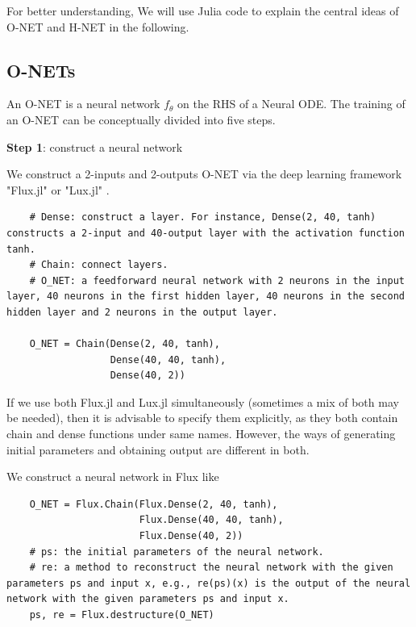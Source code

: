 \documentclass[
	parskip, 			   %
	twoside, 			   %
	DIV=14, 			   %
	BCOR=15.0mm, 		   %
	headsepline, 		   %
	open=right, 		   %
	captions=tableheading, %
	bibliography=totoc,    %
	numbers=noenddot       %
]{scrreprt}
\begin{document}
For better understanding, We will use Julia code to explain the central ideas of O-NET and H-NET in the following.

\subsection{O-NETs}
An O-NET is a neural network $f_{\theta}$ on the RHS of a Neural ODE. The training of an O-NET can be conceptually divided into five steps.

\textbf{Step 1}: construct a neural network

We construct a 2-inputs and 2-outputs O-NET via the deep learning framework "Flux.jl" or "Lux.jl" \cite{pal2022lux}.
\begin{verbatim}
    # Dense: construct a layer. For instance, Dense(2, 40, tanh) constructs a 2-input and 40-output layer with the activation function tanh.
    # Chain: connect layers.
    # O_NET: a feedforward neural network with 2 neurons in the input layer, 40 neurons in the first hidden layer, 40 neurons in the second hidden layer and 2 neurons in the output layer.

    O_NET = Chain(Dense(2, 40, tanh),
                  Dense(40, 40, tanh),
                  Dense(40, 2))
\end{verbatim}

If we use both Flux.jl and Lux.jl simultaneously (sometimes a mix of both may be needed), then it is advisable to specify them explicitly, as they both contain chain and dense functions under same names. However, the ways of generating initial parameters and obtaining output are different in both.

We construct a neural network in Flux like
\begin{verbatim}
    O_NET = Flux.Chain(Flux.Dense(2, 40, tanh),
                       Flux.Dense(40, 40, tanh),
                       Flux.Dense(40, 2))
    # ps: the initial parameters of the neural network. 
    # re: a method to reconstruct the neural network with the given parameters ps and input x, e.g., re(ps)(x) is the output of the neural network with the given parameters ps and input x.
    ps, re = Flux.destructure(O_NET)
\end{verbatim}
\end{document}
